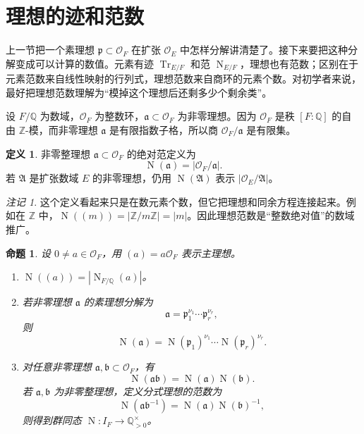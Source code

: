 \documentclass[11pt,a4paper,openany]{ctexbook}
\numberwithin{equation}{chapter}
\newcommand{\Q}{\mathbb{Q}}
\newcommand{\Z}{\mathbb{Z}}
\newcommand{\OF}{\mathcal{O}_F}
\newcommand{\Tr}{\operatorname{Tr}}
\newcommand{\Nm}{\operatorname{N}}
\theoremstyle{plain}
\newtheorem{proposition}[theorem]{命题}
\theoremstyle{definition}
\newtheorem{definition}[theorem]{定义}
\theoremstyle{remark}
\newtheorem{remark}[theorem]{注记}
\begin{document}
\section{理想的迹和范数}

上一节把一个素理想 $\mathfrak p\subset\OF$ 在扩张 $\mathcal O_E$ 中怎样分解讲清楚了。接下来要把这种分解变成可以计算的数值。元素有迹 $\Tr_{E/F}$ 和范 $\Nm_{E/F}$，理想也有范数；区别在于元素范数来自线性映射的行列式，理想范数来自商环的元素个数。对初学者来说，最好把理想范数理解为“模掉这个理想后还剩多少个剩余类”。

设 $F/\Q$ 为数域，$\OF$ 为整数环，$\mathfrak a\subset\OF$ 为非零理想。因为 $\OF$ 是秩 $[F:\Q]$ 的自由 $\Z$-模，而非零理想 $\mathfrak a$ 是有限指数子格，所以商 $\OF/\mathfrak a$ 是有限集。

\begin{definition}
非零整理想 $\mathfrak a\subset\OF$ 的绝对范定义为
\[
\Nm(\mathfrak a)=|\OF/\mathfrak a|.
\]
若 $\mathfrak A$ 是扩张数域 $E$ 的非零理想，仍用 $\Nm(\mathfrak A)$ 表示 $|\mathcal O_E/\mathfrak A|$。
\end{definition}

\begin{remark}
这个定义看起来只是在数元素个数，但它把理想和同余方程连接起来。例如在 $\Z$ 中，$\Nm((m))=|\Z/m\Z|=|m|$。因此理想范数是“整数绝对值”的数域推广。
\end{remark}

\begin{proposition}
设 $0\ne a\in\OF$，用 $(a)=a\OF$ 表示主理想。
\begin{enumerate}[label=(\arabic*)]
\item $\Nm((a))=|\Nm_{F/\Q}(a)|$。
\item 若非零理想 $\mathfrak a$ 的素理想分解为
\[
\mathfrak a=\mathfrak p_1^{\nu_1}\cdots\mathfrak p_r^{\nu_r},
\]
则
\[
\Nm(\mathfrak a)=\Nm(\mathfrak p_1)^{\nu_1}\cdots
\Nm(\mathfrak p_r)^{\nu_r}.
\]
\item 对任意非零理想 $\mathfrak a,\mathfrak b\subset\OF$，有
\[
\Nm(\mathfrak a\mathfrak b)=\Nm(\mathfrak a)\Nm(\mathfrak b).
\]
若 $\mathfrak a,\mathfrak b$ 为非零整理想，定义分式理想的范数为
\[
\Nm(\mathfrak a\mathfrak b^{-1})=\Nm(\mathfrak a)\Nm(\mathfrak b)^{-1},
\]
则得到群同态 $\Nm:I_F\to\Q_{>0}^{\times}$。
\end{enumerate}
\end{proposition}
\end{document}
